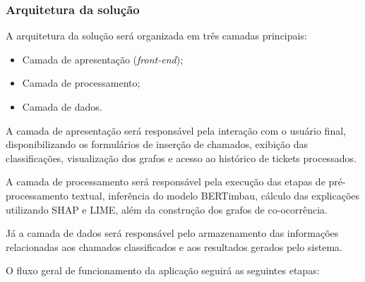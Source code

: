 \documentclass[
    12pt,                %
    openright,           %
    oneside,             %
    a4paper,             %
    english,             %
    brazil               %
]{abntex2}
\begin{document}
\subsubsection{Arquitetura da solução}

A arquitetura da solução será organizada em três camadas principais:

\begin{itemize}
    \item Camada de apresentação (\textit{front-end});
    \item Camada de processamento;
    \item Camada de dados.
\end{itemize}

A camada de apresentação será responsável pela interação com o usuário final, disponibilizando os formulários de inserção de chamados, exibição das classificações, visualização dos grafos e acesso ao histórico de tickets processados.

A camada de processamento será responsável pela execução das etapas de pré-processamento textual, inferência do modelo BERTimbau, cálculo das explicações utilizando SHAP e LIME, além da construção dos grafos de co-ocorrência.

Já a camada de dados será responsável pelo armazenamento das informações relacionadas aos chamados classificados e aos resultados gerados pelo sistema.

O fluxo geral de funcionamento da aplicação seguirá as seguintes etapas:
\end{document}
